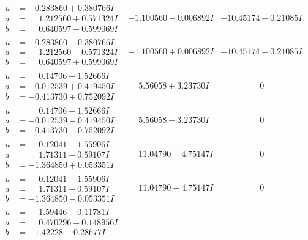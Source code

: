\documentclass[1p]{elsarticle_modified}
\theoremstyle{definition}
\begin{document}
$$\begin{array}{c|c|c}
\begin{aligned}
u &= -0.283860 + 0.380766 I \\
a &= \phantom{-}1.212560 + 0.571324 I \\
b &= \phantom{-}0.640597 - 0.599069 I\end{aligned}
 & -1.100560 - 0.006892 I & -10.45174 + 0.21085 I \\ \hline\begin{aligned}
u &= -0.283860 - 0.380766 I \\
a &= \phantom{-}1.212560 - 0.571324 I \\
b &= \phantom{-}0.640597 + 0.599069 I\end{aligned}
 & -1.100560 + 0.006892 I & -10.45174 - 0.21085 I \\ \hline\begin{aligned}
u &= \phantom{-}0.14706 + 1.52666 I \\
a &= -0.012539 + 0.419450 I \\
b &= -0.413730 + 0.752092 I\end{aligned}
 & \phantom{-}5.56058 + 3.23730 I & \phantom{-0.000000 } 0 \\ \hline\begin{aligned}
u &= \phantom{-}0.14706 - 1.52666 I \\
a &= -0.012539 - 0.419450 I \\
b &= -0.413730 - 0.752092 I\end{aligned}
 & \phantom{-}5.56058 - 3.23730 I & \phantom{-0.000000 } 0 \\ \hline\begin{aligned}
u &= \phantom{-}0.12041 + 1.55906 I \\
a &= \phantom{-}1.71311 + 0.59107 I \\
b &= -1.364850 + 0.053351 I\end{aligned}
 & \phantom{-}11.04790 + 4.75147 I & \phantom{-0.000000 } 0 \\ \hline\begin{aligned}
u &= \phantom{-}0.12041 - 1.55906 I \\
a &= \phantom{-}1.71311 - 0.59107 I \\
b &= -1.364850 - 0.053351 I\end{aligned}
 & \phantom{-}11.04790 - 4.75147 I & \phantom{-0.000000 } 0 \\ \hline\begin{aligned}
u &= \phantom{-}1.59446 + 0.11781 I \\
a &= \phantom{-}0.470296 - 0.148956 I \\
b &= -1.42228 - 0.28677 I\end{aligned}

\end{array}$$
\end{document}
